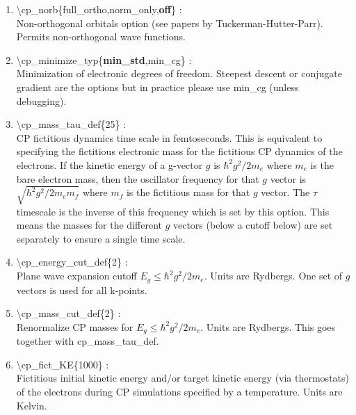 \documentclass[12pt,titlepage]{article}
\begin{document}
\begin{enumerate}
 \vspace{0.15in} 
 \item  \textbackslash cp\_norb\{full\_ortho,norm\_only,{\bf off}\} : \\
     Non-orthogonal orbitals option (see papers by Tuckerman-Hutter-Parr).  Permits non-orthogonal wave functions.

 \vspace{0.15in} 
 \item  \textbackslash cp\_minimize\_typ\{{\bf min\_std},min\_cg\} : \\
      Minimization of electronic degrees of freedom.  Steepest descent or conjugate gradient are the options but in practice please use min\_cg (unless debugging).

 \vspace{0.15in} 
 \item  \textbackslash cp\_mass\_tau\_def\{25\} : \\
      CP fictitious dynamics time scale in femtoseconds.  This is equivalent to specifying the fictitious electronic mass for the fictitious CP dynamics of the electrons.  If the kinetic energy of a g-vector $g$ is $\hbar^2 g^2/2m_e$ where $m_e$ is the bare electron mass, then the oscillator frequency for that $g$ vector is $\sqrt{\hbar^2 g^2/2m_em_f}$ where $m_f$ is the fictitious mass for that $g$ vector.  The $\tau$ timescale is the inverse of this frequency which is set by this option.  This means the masses for the different $g$ vectors (below a cutoff below) are set separately to ensure a single time scale.

 \vspace{0.15in} 
 \item  \textbackslash cp\_energy\_cut\_def\{2\} : \\
      Plane wave expansion cutoff $E_g\le \hbar^2g^2/2m_e$.  Units are Rydbergs.  One set of $g$ vectors is used for all k-points.

 \vspace{0.15in} 
 \item  \textbackslash cp\_mass\_cut\_def\{2\} : \\
      Renormalize CP masses for $E_g\le\hbar^2g^2/2m_e$.  Units are Rydbergs.  This goes together with cp\_mass\_tau\_def.

 \vspace{0.15in} 
 \item  \textbackslash cp\_fict\_KE\{1000\} : \\
      Fictitious initial kinetic energy and/or target kinetic energy (via thermostats) of the electrons during CP simulations specified by a temperature.  Units are Kelvin.


\end{enumerate}
\end{document}
